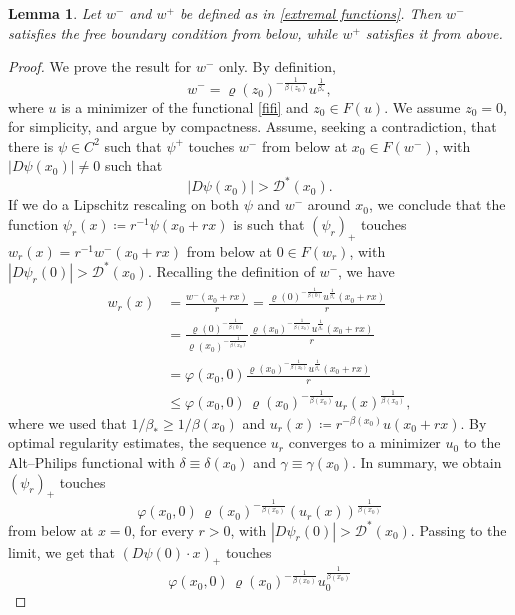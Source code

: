 \documentclass[reqno,11pt]{amsart}
\newtheorem{lemma}{Lemma}[section]
\newcommand{\1}{\mathds{1}}
\numberwithin{equation}{section}
\begin{document}
\begin{lemma}
Let $w^{-}$ and $w^{+}$ be defined as in \eqref{extremal functions}.  
Then $w^{-}$ satisfies the free boundary condition from below, while $w^{+}$ 
satisfies it from above.
\end{lemma}

\begin{proof}
We prove the result for $w^-$ only. By definition,
$$
    w^- = \varrho(z_0)^{-\frac{1}{\beta(z_0)}} u^{\frac{1}{\beta
    _\ast}},
$$
where $u$ is a minimizer of the functional \eqref{fifi} and $z_0 \in F(u)$. We assume $z_0 = 0$, for simplicity, and argue by compactness. Assume, seeking a contradiction, that there is $\psi \in C^2$ such that $\psi^+$ touches $w^-$ from below at $x_0 \in F(w^-)$, with $|D\psi(x_0)| \not = 0$ such that
$$
    |D\psi(x_0)| > \mathcal{D}^\ast(x_0).
$$
If we do a Lipschitz rescaling on both $\psi$ and $w^-$ around $x_0$, we conclude that the function $\psi_r(x) \coloneqq r^{-1}\psi(x_0 + rx)$ is such that $(\psi_r)_+$ touches $w_r(x) = r^{-1}w^-(x_0 + rx)$ from below at $0 \in F(w_r)$, with $|D\psi_r(0)| > \mathcal{D}^\ast(x_0)$. Recalling the definition of $w^-$, we have
\begin{align*}
    w_r(x) & = \frac{w^-(x_0 + rx)}{r} = \frac{\varrho(0)^{-\frac{1}{\beta(0)}}u^{\frac{1}{\beta_\ast}}(x_0 + rx)}{r}\\
            & = \frac{\varrho(0)^{-\frac{1}{\beta(0)}}}{\varrho(x_0)^{-\frac{1}{\beta(x_0)}}}\frac{\varrho(x_0)^{-\frac{1}{\beta(x_0)}}u^{\frac{1}{\beta_\ast}}(x_0 + rx)}{r}\\
            & = \varphi(x_0,0)\frac{\varrho(x_0)^{-\frac{1}{\beta(x_0)}}u^{\frac{1}{\beta_\ast}}(x_0 + rx)}{r}\\
            & \leq \varphi(x_0,0)\, \varrho(x_0)^{-\frac{1}{\beta(x_0)}} u_r(x)^{\frac{1}{\beta(x_0)}},
\end{align*}
where we used that $1/\beta_\ast \geq 1/\beta(x_0)$ and $u_r(x) \coloneqq r^{-\beta(x_0)}u(x_0+rx)$. By optimal regularity estimates, the sequence $u_r$ converges to a minimizer $u_0$ to the Alt--Philips functional with $\delta \equiv \delta(x_0)$ and $\gamma \equiv \gamma(x_0)$. In summary, we obtain $(\psi_r)_+$ touches 
$$
    \varphi(x_0,0)\, \varrho(x_0)^{-\frac{1}{\beta(x_0)}} \left(u_r(x) \right)^{\frac{1}{\beta(x_0)}}
$$
from below at $x=0$, for every $r>0$, with $|D\psi_r(0)|>\mathcal{D}^\ast(x_0)$. Passing to the limit, we get that $(D\psi(0)\cdot x)_+$ touches 
$$
    \varphi(x_0,0)\, \varrho(x_0)^{-\frac{1}{\beta(x_0)}} u_0^{\frac{1}{\beta(x_0)}}
$$

\end{proof}
\end{document}
